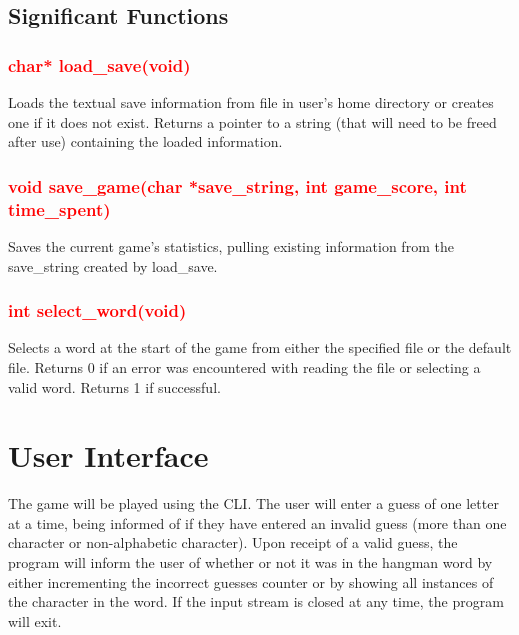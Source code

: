 \documentclass[11pt]{report}
\begin{document}
\subsection*{Significant Functions}
\subsubsection*{\textbf{\textcolor{red}{char* load\_save(void)}}}
Loads the textual save information from file in user's home directory or creates one if it does not exist. Returns a pointer to a string (that will need to be freed after use) containing the loaded information.
\subsubsection*{\textbf{\textcolor{red}{void save\_game(char *save\_string, int game\_score, int time\_spent)}}}
Saves the current game's statistics, pulling existing information from the save\_string created by load\_save.
\subsubsection*{\textbf{\textcolor{red}{int select\_word(void)}}}
Selects a word at the start of the game from either the specified file or the default file. Returns 0 if an error was encountered with reading the file or selecting a valid word. Returns 1 if successful.
\section*{User Interface}
The game will be played using the CLI. The user will enter a guess of one letter at a time, being informed of if they have entered an invalid guess (more than one character or non-alphabetic character). Upon receipt of a valid guess, the program will inform the user of whether or not it was in the hangman word by either incrementing the incorrect guesses counter or by  showing all instances of the character in the word. If the input stream is closed at any time, the program will exit. 
\end{document}
